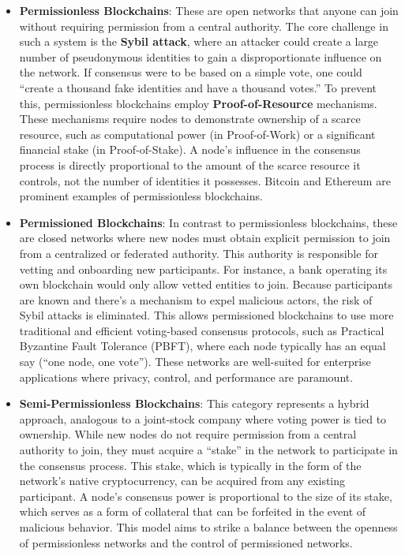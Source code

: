 \begin{itemize}
	\item
	\textbf{Permissionless Blockchains}: These are open networks that
	anyone can join without requiring permission from a central authority.
	The core challenge in such a system is the \textbf{Sybil attack},
	where an attacker could create a large number of pseudonymous
	identities to gain a disproportionate influence on the network. 
	If consensus were to be based on a simple vote, one
	could ``create a thousand fake identities and have a thousand votes.''
	To prevent this, permissionless blockchains employ
	\textbf{Proof-of-Resource} mechanisms. These mechanisms require nodes
	to demonstrate ownership of a scarce resource, such as computational
	power (in Proof-of-Work) or a significant financial stake (in
	Proof-of-Stake). A node's influence in the consensus process is
	directly proportional to the amount of the scarce resource it
	controls, not the number of identities it possesses. Bitcoin and
	Ethereum are prominent examples of permissionless blockchains.
	\item
	\textbf{Permissioned Blockchains}: In contrast to permissionless
	blockchains, these are closed networks where new nodes must obtain
	explicit permission to join from a centralized or federated authority.
	This authority is responsible for vetting and onboarding new
	participants. For instance, a bank operating its own blockchain would
	only allow vetted entities to join. Because participants are known and
	there's a mechanism to expel malicious actors, the risk of Sybil
	attacks is eliminated. This allows permissioned blockchains to use
	more traditional and efficient voting-based consensus protocols, such
	as Practical Byzantine Fault Tolerance (PBFT), where each node
	typically has an equal say (``one node, one vote''). These networks
	are well-suited for enterprise applications where privacy, control,
	and performance are paramount.
	\item
	\textbf{Semi-Permissionless Blockchains}: This category represents a
	hybrid approach, analogous to a joint-stock company where voting power
	is tied to ownership. While new nodes do not require permission from a
	central authority to join, they must acquire a ``stake'' in the
	network to participate in the consensus process. This stake, which is
	typically in the form of the network's native cryptocurrency, can be
	acquired from any existing participant. A node's consensus power is
	proportional to the size of its stake, which serves as a form of
	collateral that can be forfeited in the event of malicious behavior.
	This model aims to strike a balance between the openness of
	permissionless networks and the control of permissioned networks.
\end{itemize}

